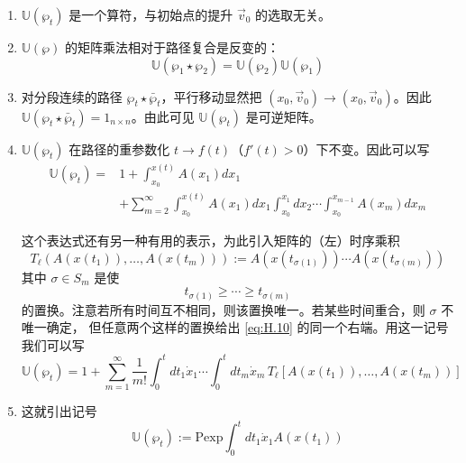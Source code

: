 \begin{enumerate}
  \item $\mathbb{U}(\wp_t)$ 是一个算符，与初始点的提升 $\vec{v}_0$ 的选取无关。
  \item $\mathbb{U}(\wp)$ 的矩阵乘法相对于路径复合是反变的：
    \begin{equation}
      \mathbb{U}(\wp_1\star\wp_2) = \mathbb{U}(\wp_2)\mathbb{U}(\wp_1)
      \tag{H.8}
      \label{eq:H.8}
    \end{equation}
  \item 对分段连续的路径 $\wp_t\star\bar{\wp}_t$，平行移动显然把
    $(x_0,\vec{v}_0)\to(x_0,\vec{v}_0)$。因此
    $\mathbb{U}(\wp_t\star\bar{\wp}_t)=1_{n\times n}$。由此可见 $\mathbb{U}(\wp_t)$ 是可逆矩阵。
  \item $\mathbb{U}(\wp_t)$ 在路径的重参数化 $t\to f(t)$（$f'(t)>0$）下不变。因此可以写
    \begin{equation}
      \begin{aligned}
        \mathbb{U}(\wp_t) = {}& 1 + \int_{x_0}^{x(t)} A(x_1)dx_1 \\
        &+ \sum_{m=2}^{\infty}\int_{x_0}^{x(t)} A(x_1)dx_1\int_{x_0}^{x_1}dx_2\cdots
          \int_{x_0}^{x_{m-1}} A(x_m)dx_m
      \end{aligned}
      \tag{H.9}
      \label{eq:H.9}
    \end{equation}

    这个表达式还有另一种有用的表示，为此引入矩阵的（左）时序乘积
    \begin{equation}
      T_\ell\left(A(x(t_1)),\dots,A(x(t_m))\right)
      := A(x(t_{\sigma(1)}))\cdots A(x(t_{\sigma(m)}))
      \tag{H.10}
      \label{eq:H.10}
    \end{equation}
    其中 $\sigma\in S_m$ 是使
    \begin{equation}
      t_{\sigma(1)} \ge \cdots \ge t_{\sigma(m)}
      \tag{H.11}
      \label{eq:H.11}
    \end{equation}
    的置换。注意若所有时间互不相同，则该置换唯一。若某些时间重合，则 $\sigma$ 不唯一确定，
    但任意两个这样的置换给出 \eqref{eq:H.10} 的同一个右端。用这一记号我们可以写
    \begin{equation}
      \mathbb{U}(\wp_t) = 1 + \sum_{m=1}^{\infty}\frac{1}{m!}\int_0^t dt_1\dot{x}_1\cdots
      \int_0^t dt_m\dot{x}_m\, T_\ell\left[A(x(t_1)),\dots,A(x(t_m))\right]
      \tag{H.12}
      \label{eq:H.12}
    \end{equation}

  \item 这就引出记号
    \begin{equation}
      \mathbb{U}(\wp_t) := \mathrm{Pexp}\int_0^t dt_1\dot{x}_1 A(x(t_1))
      \tag{H.13}
      \label{eq:H.13}
    \end{equation}


\end{enumerate}
